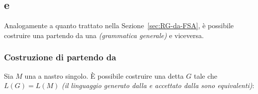 \documentclass[italian, 10pt]{article}
\begin{document}
\subsection{\GG e \TM}

Analogamente a quanto trattato nella Sezione~\ref{sec:RG-da-FSA}, è possibile costruire una \TM partendo da una \GG \textit{(grammatica generale)} e viceversa.

\subsubsection{Costruzione di \GG partendo da \TM}

Sia \(M\) una \TM a nastro singolo.
È possibile costruire una \GG detta \(G\) tale che \(L(G) = L(M)\) \textit{(il linguaggio generato dalla \GG e accettato dalla \NTM sono equivalenti)}:
\end{document}

